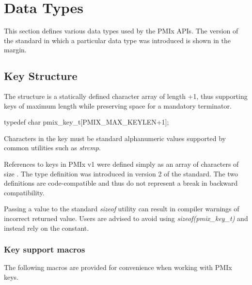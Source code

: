 \section{Data Types}

This section defines various data types used by the \ac{PMIx} APIs. The version of the standard in which a particular data type was introduced is shown in the margin.

\subsection{Key Structure}

The  structure is a statically defined character array of length +1, thus supporting keys of maximum length  while preserving space for a mandatory  terminator.

\cspecificstart
\begin{codepar}
typedef char pmix_key_t[PMIX_MAX_KEYLEN+1];
\end{codepar}
\cspecificend

Characters in the key must be standard alphanumeric values supported by common utilities such as \textit{strcmp}.

\adviceuserstart
References to keys in \ac{PMIx} v1 were defined simply as an array of characters of size . The  type definition was introduced in version 2 of the standard. The two definitions are code-compatible and thus do not represent a break in backward compatibility.

Passing a  value to the standard \textit{sizeof} utility can result in compiler warnings of incorrect returned value. Users are advised to avoid using \textit{sizeof(pmix_key_t)} and instead rely on the  constant.
\adviceuserend

\subsubsection{Key support macros}

The following macros are provided for convenience when working with \ac{PMIx} keys.

